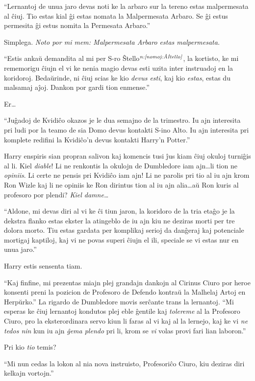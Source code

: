 ``Lernantoj de unua jaro devas noti ke la arbaro sur la tereno estas
malpermesata al ĉiuj. Tio estas kial ĝi estas nomata la Malpermesata
Arbaro. Se ĝi estus permesita ĝi estus nomita la Permesata Arbaro.''

Simplega. \emph{Noto por mi mem: Malpermesata Arbaro estas
  malpermesata.}

``Estis ankaŭ demandita al mi per S-ro Ŝtello$^{\textit{n:\ref{nomoj:ŝtello}}}$,
la kortisto, ke mi rememorigu ĉiujn el vi ke nenia magio devas esti
uzita inter instruadoj en la koridoroj. Bedaŭrinde, ni ĉiuj scias ke
kio \emph{devus esti}, kaj kio \emph{estas}, estas du malsamaj
aĵoj. Dankon por gardi tion enmense.''

Er\ldots

``Juĝadoj de Kvidiĉo okazos je le dua semajno de la trimestro. Iu ajn
interesita pri ludi por la teamo de sia Domo devus kontakti S-ino
Alto. Iu ajn interesita pri komplete redifini
la Kvidiĉo'n devus kontakti Harry'n Potter.''

Harry enspiris sian propran salivon kaj komencis tusi ĵus kiam ĉiuj
okuloj turniĝis al li. Kiel \emph{diable}! Li ne renkontis la okulojn
de Dumbledore iam ajn\ldots li tion ne \emph{opiniis}. Li certe ne
pensis pri Kvidiĉo iam ajn! Li ne parolis pri tio al iu ajn krom Ron
Wizle kaj li ne opiniis ke Ron dirintus tion al iu ajn alia\ldots aŭ
Ron kuris al profesoro por plendi? \emph{Kiel damne\ldots}

``Aldone, mi devas diri al vi ke ĉi tiun jaron, la koridoro de la tria
etaĝo je la dekstra flanko estas ekster la atingeblo de iu ajn kiu ne
deziras morti per tre dolora morto. Tiu estas gardata per komplikaj
serioj da danĝeraj kaj potenciale mortigaj kaptiloj, kaj vi ne povas
superi ĉiujn el ili, speciale se vi estas nur en unua jaro.''

Harry estis sensenta tiam.

``Kaj finfine, mi prezentas miajn plej grandajn dankojn al Cirinus
Ciuro por heroe konsenti preni la pozicion de Profesoro de Defendo
kontraŭ la Malhelaj Artoj en Herpŭrko.'' La rigardo de Dumbledore
movis serĉante trans la lernantoj. ``Mi esperas ke ĉiuj lernantoj
kondutos plej eble ĝentile kaj \emph{tolereme} al la Profesoro Ciuro,
pro la eksterordinara servo kiun li faras al vi kaj al la lernejo, kaj
ke vi \emph{ne tedos nin} kun iu ajn \emph{ĝema plendo} pri li, krom
se \emph{vi} volas provi fari lian laboron.''

Pri kio \emph{tio} temis?

``Mi nun cedas la lokon al nia nova instruisto, Profesoriĉo Ciuro, kiu
deziras diri kelkajn vortojn.''

